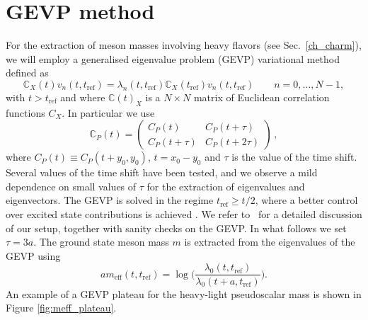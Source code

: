 \chapter{GEVP method}
\label{apex_GEVP}

For the extraction of meson masses involving heavy flavors (see Sec.~\ref{ch_charm}), we will employ a generalised eigenvalue problem (GEVP) variational method defined as 
\begin{equation}\label{eq:gevp_sec3}
 	\mathit{\mathbb{C}}_X(t) v_n(t,t_{\mathrm{ref}}) = \lambda_n(t,t_{\mathrm{ref}}) \mathit{\mathbb{C}}_X(t_{\mathrm{ref}})v_n(t,t_{\mathrm{ref}}) \qquad n=0,\ldots,N-1 ,
\end{equation}
with $t>t_{\mathrm{ref}}$ and where $\mathit{\mathbb{C}}(t)_X$ is a $N\times N$ matrix of Euclidean correlation functions $C_X$. In particular we use
\begin{equation}
 	\mathit{\mathbb{C}}_{P}(t) = \left(\begin{matrix}
 		C_{P}(t)  &  C_{P}(t+\tau)
 		\\
 		C_{P}(t+\tau)  & C_{P}(t+2\tau)
 	\end{matrix}\right) \,,
\label{eq:gevp_matrix}
\end{equation}
where $C_P(t)\equiv C_P(t+y_0,y_0)$, $t=x_0-y_0$ and $\tau$ is the value of the time shift. Several values of the time shift have been tested, and we observe a mild dependence on small values of $\tau$ for the extraction of eigenvalues and eigenvectors. The GEVP  is solved in the regime  $t_{\mathrm{ref}} \geq t/2$, where a better control over excited state contributions is achieved \cite{Blossier:2009kd}. We refer to~\citep{charm} for a detailed discussion of our setup, together with sanity checks on the GEVP. In what follows we set $\tau=3a$. The ground state meson mass $m$ is extracted from the eigenvalues of the GEVP using 
\begin{equation}\label{eq:eff_en_gevp}
	am_{\mathrm{eff}}(t,t_{\mathrm{ref}})=\log\bigg(\frac{\lambda_0(t,t_{\mathrm{ref}})}{\lambda_0(t+a,t_{\mathrm{ref}})}\bigg).
\end{equation}
An example of a GEVP plateau for the heavy-light pseudoscalar mass is shown in Figure \ref{fig:meff_plateau}. 
 
